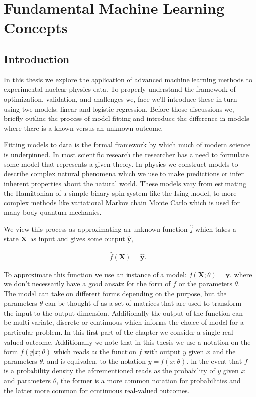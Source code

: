\chapter{Fundamental Machine Learning Concepts}\label{chap:fundament}
\section{Introduction}\label{sec:fundament_intro}

In this thesis we explore the application of advanced machine learning methods to experimental nuclear physics data. To properly understand the framework of optimization, validation, and challenges we, face we'll introduce these in turn using two models: linear and logistic regression. Before those discussions we, briefly outline the process of model fitting and introduce the difference in models where there is a known versus an unknown outcome.

Fitting models to data is the formal framework by which much of modern science is underpinned. In most scientific research the researcher has a need to formulate some model that represents a given theory. In physics we construct models to describe complex natural phenomena which we use to make predictions or infer inherent properties about the natural world. These models vary from estimating the Hamiltonian of a simple binary spin system like the Ising model, to more complex methods like variational Markov chain Monte Carlo which is used for many-body quantum mechanics.

We view this process as approximating an unknown function $\hat{f}$ which takes a state $\mathbf{X}$ as input and gives some output $\mathbf{\hat{y}}$,  
 
 \begin{align}
 \hat{f}(\mathbf{X}) = \mathbf{\hat{y}}.
 \end{align}

\noindent To approximate this function we use an instance of a model: $f(\mathbf{X}; \theta) = \mathbf{y}$, where we don't necessarily have a good ansatz for the form of $f$ or the parameters $\theta$. The model can take on different forms depending on the purpose, but the parameters $\theta$ can be thought of as a set of matrices that are used to transform the input to the output dimension. Additionally the output of the function can be multi-variate, discrete or continuous which informs the choice of model for a particular problem. In this first part of the chapter we consider a single real valued outcome. Additionally we note  that in this thesis we use a notation on the form $f(y | x; \theta )$ which reads as the function $f$ with output $y$ given $x$ and the parameters $\theta$, and is equivalent to the notation $y = f(x; \theta)$. In the event that $f$ is a probability density the aforementioned reads as the probability of $y$ given $x$ and parameters $\theta$, the former is a more common notation for probabilities and the latter more common for continuous real-valued outcomes. 


